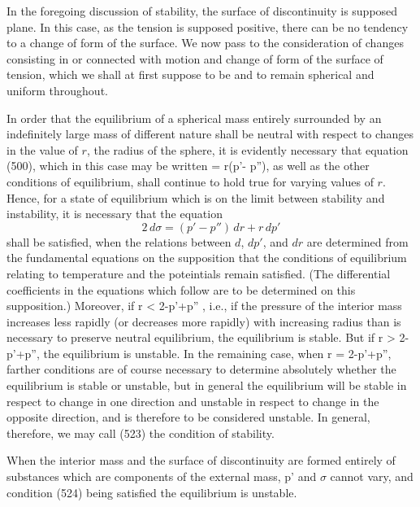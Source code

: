 \documentclass[12pt]{memoir}
\begin{document}
{%

In the foregoing discussion of stability, the surface of discontinuity is supposed plane. In this case, as the tension is supposed positive, there can be no tendency to a change of form of the surface. We now pass to the consideration of changes consisting in or connected with motion and change of form of the surface of tension, which we shall at first suppose to be and to remain spherical and uniform throughout.

In order that the equilibrium of a spherical mass entirely surrounded by an indefinitely large mass of different nature shall be neutral with respect to changes in the value of $r$, the radius of the sphere, it is evidently necessary that equation (500), which in this case may be written
\sigma= r(p'- p''), \label{522} \eqe
as well as the other conditions of equilibrium, shall continue to hold true for varying values of $r$. Hence, for a state of equilibrium which is on the limit between stability and instability, it is necessary that the equation
$$ 2 \, d\sigma = (p' -p'') \, dr + r \, dp' $$
shall be satisfied, when the relations between $d$, $dp'$, and $dr$ are determined from the fundamental equations on the supposition that the conditions of equilibrium relating to temperature and the poteintials remain satisfied. (The differential coefficients in the equations which follow are to be determined on this supposition.) Moreover, if
\eqs r   < 2-p'+p'' , \label{523} \eqe
i.e., if the pressure of the interior mass increases less rapidly (or decreases more rapidly) with increasing radius than is necessary to preserve neutral equilibrium, the equilibrium is stable. But if
\eqs r   > 2-p'+p'',  \label{524} \eqe
the equilibrium is unstable. In the remaining case, when
\eqs r   = 2-p'+p'', \label{525} \eqe
farther conditions are of course necessary to determine absolutely whether the equilibrium is stable or unstable, but in general the equilibrium will be stable in respect to change in one direction and unstable in respect to change in the opposite direction, and is therefore to be considered unstable. In general, therefore, we may call (523) the condition of stability.

When the interior mass and the surface of discontinuity are formed entirely of substances which are components of the external mass, p' and $\sigma$ cannot vary, and condition (524) being satisfied the equilibrium is unstable.

}
\end{document}
